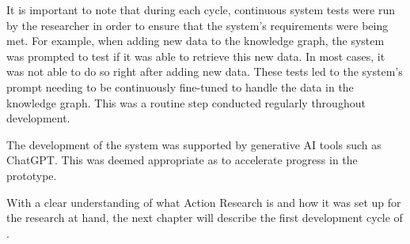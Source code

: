 It is important to note that during each cycle, continuous system tests were run by the researcher in order to ensure that the system's requirements were being met. For example, when adding new data to the knowledge graph, the system was prompted to test if it was able to retrieve this new data. In most cases, it was not able to do so right after adding new data. These tests led to the system's prompt needing to be continuously fine-tuned to handle the data in the knowledge graph. This was a routine step conducted regularly throughout development.

The development of the system was supported by generative AI tools such as ChatGPT. This was deemed appropriate as to accelerate progress in the prototype. \cite{openai_chatgpt_2023}


With a clear understanding of what Action Research is and how it was set up for the research at hand, the next chapter will describe the first development cycle of \prototype{}.


